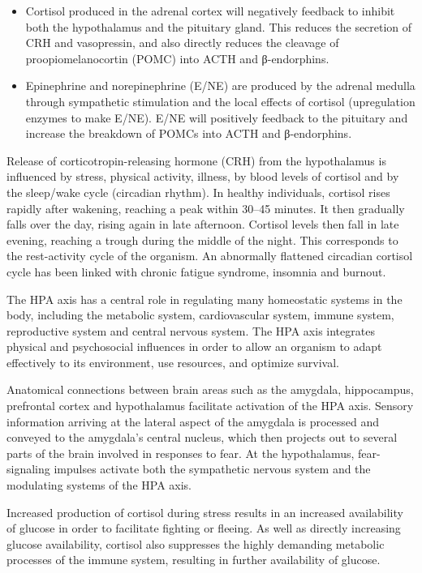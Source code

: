 \begin{itemize}
\tightlist
\item
  Cortisol produced in the adrenal cortex will negatively feedback to inhibit both the hypothalamus and the pituitary gland. This reduces the secretion of CRH and vasopressin, and also directly reduces the cleavage of proopiomelanocortin (POMC) into ACTH and β-endorphins.
\item
  Epinephrine and norepinephrine (E/NE) are produced by the adrenal medulla through sympathetic stimulation and the local effects of cortisol (upregulation enzymes to make E/NE). E/NE will positively feedback to the pituitary and increase the breakdown of POMCs into ACTH and β-endorphins.
\end{itemize}

Release of corticotropin-releasing hormone (CRH) from the hypothalamus is influenced by stress, physical activity, illness, by blood levels of cortisol and by the sleep/wake cycle (circadian rhythm). In healthy individuals, cortisol rises rapidly after wakening, reaching a peak within 30--45 minutes. It then gradually falls over the day, rising again in late afternoon. Cortisol levels then fall in late evening, reaching a trough during the middle of the night. This corresponds to the rest-activity cycle of the organism. An abnormally flattened circadian cortisol cycle has been linked with chronic fatigue syndrome, insomnia and burnout.

The HPA axis has a central role in regulating many homeostatic systems in the body, including the metabolic system, cardiovascular system, immune system, reproductive system and central nervous system. The HPA axis integrates physical and psychosocial influences in order to allow an organism to adapt effectively to its environment, use resources, and optimize survival.

Anatomical connections between brain areas such as the amygdala, hippocampus, prefrontal cortex and hypothalamus facilitate activation of the HPA axis. Sensory information arriving at the lateral aspect of the amygdala is processed and conveyed to the amygdala's central nucleus, which then projects out to several parts of the brain involved in responses to fear. At the hypothalamus, fear-signaling impulses activate both the sympathetic nervous system and the modulating systems of the HPA axis.

Increased production of cortisol during stress results in an increased availability of glucose in order to facilitate fighting or fleeing. As well as directly increasing glucose availability, cortisol also suppresses the highly demanding metabolic processes of the immune system, resulting in further availability of glucose.

